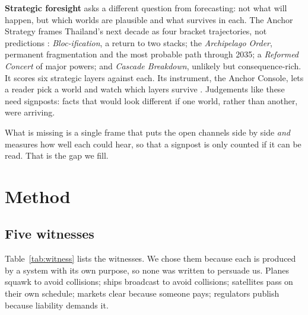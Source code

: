 \documentclass[10pt,twocolumn,letterpaper]{article}
\begin{document}
\textbf{Strategic foresight} asks a different question from forecasting: not what will happen, but which worlds are plausible and what survives in each. The Anchor Strategy frames Thailand's next decade as four bracket trajectories, not predictions \citep{thiengburanathum2026anchor}: \emph{Bloc-ification}, a return to two stacks; the \emph{Archipelago Order}, permanent fragmentation and the most probable path through 2035; a \emph{Reformed Concert} of major powers; and \emph{Cascade Breakdown}, unlikely but consequence-rich. It scores six strategic layers against each. Its instrument, the Anchor Console, lets a reader pick a world and watch which layers survive \citep{anchorconsole}. Judgements like these need signposts: facts that would look different if one world, rather than another, were arriving.

What is missing is a single frame that puts the open channels side by side \emph{and} measures how well each could hear, so that a signpost is only counted if it can be read. That is the gap we fill.

\section{Method}
\subsection{Five witnesses}
Table~\ref{tab:witness} lists the witnesses. We chose them because each is produced by a system with its own purpose, so none was written to persuade us. Planes squawk to avoid collisions; ships broadcast to avoid collisions; satellites pass on their own schedule; markets clear because someone pays; regulators publish because liability demands it.
\end{document}
